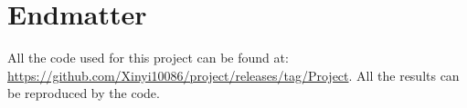 \section{Endmatter} 
\label{sec:endmatter}

All the code used for this project can be found at: \url{https://github.com/Xinyi10086/project/releases/tag/Project}.
All the results can be reproduced by the code.